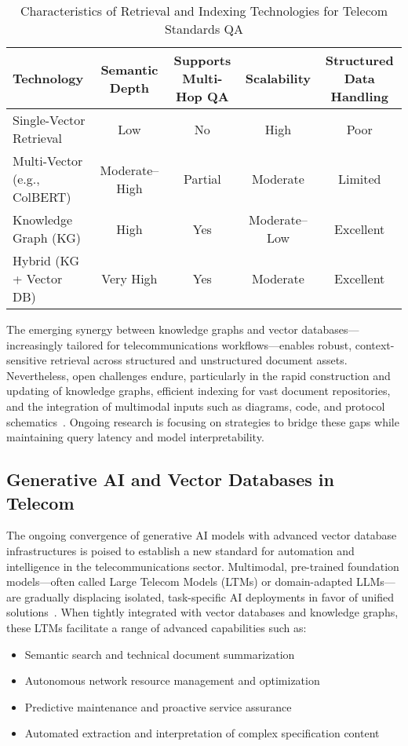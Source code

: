 \documentclass[11pt]{article}
\begin{document}
\begin{table}[ht]
\centering
\caption{Characteristics of Retrieval and Indexing Technologies for Telecom Standards QA}
\label{tab:retrieval_technologies}
\begin{tabular}{|l|c|c|c|c|}
\hline
\textbf{Technology} & \textbf{Semantic Depth} & \textbf{Supports Multi-Hop QA} & \textbf{Scalability} & \textbf{Structured Data Handling} \\
\hline
Single-Vector Retrieval & Low & No & High & Poor \\
Multi-Vector (e.g., ColBERT) & Moderate--High & Partial & Moderate & Limited \\
Knowledge Graph (KG) & High & Yes & Moderate--Low & Excellent \\
Hybrid (KG + Vector DB) & Very High & Yes & Moderate & Excellent \\
\hline
\end{tabular}
\end{table}

The emerging synergy between knowledge graphs and vector databases---increasingly tailored for telecommunications workflows---enables robust, context-sensitive retrieval across structured and unstructured document assets. Nevertheless, open challenges endure, particularly in the rapid construction and updating of knowledge graphs, efficient indexing for vast document repositories, and the integration of multimodal inputs such as diagrams, code, and protocol schematics~\cite{ref20, ref21, ref26}. Ongoing research is focusing on strategies to bridge these gaps while maintaining query latency and model interpretability.

\subsection{Generative AI and Vector Databases in Telecom}

The ongoing convergence of generative AI models with advanced vector database infrastructures is poised to establish a new standard for automation and intelligence in the telecommunications sector. Multimodal, pre-trained foundation models---often called Large Telecom Models (LTMs) or domain-adapted LLMs---are gradually displacing isolated, task-specific AI deployments in favor of unified solutions~\cite{ref5.1, ref5.1.1}. When tightly integrated with vector databases and knowledge graphs, these LTMs facilitate a range of advanced capabilities such as:

\begin{itemize}
    \item Semantic search and technical document summarization
    \item Autonomous network resource management and optimization
    \item Predictive maintenance and proactive service assurance
    \item Automated extraction and interpretation of complex specification content
\end{itemize}
\end{document}
